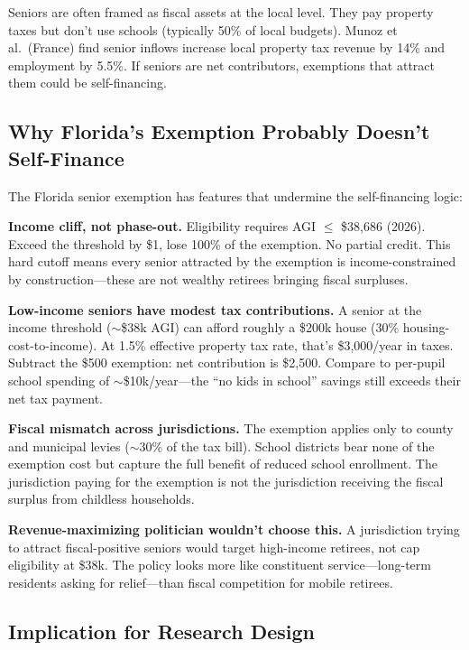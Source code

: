 \documentclass[11pt]{article}
\begin{document}
Seniors are often framed as fiscal assets at the local level. They pay property taxes but don't use schools (typically 50\% of local budgets). Munoz et al.\ (France) find senior inflows increase local property tax revenue by 14\% and employment by 5.5\%. If seniors are net contributors, exemptions that attract them could be self-financing.

\subsection{Why Florida's Exemption Probably Doesn't Self-Finance}

The Florida senior exemption has features that undermine the self-financing logic:

\textbf{Income cliff, not phase-out.} Eligibility requires AGI $\leq$ \$38,686 (2026). Exceed the threshold by \$1, lose 100\% of the exemption. No partial credit. This hard cutoff means every senior attracted by the exemption is income-constrained by construction---these are not wealthy retirees bringing fiscal surpluses.

\textbf{Low-income seniors have modest tax contributions.} A senior at the income threshold ($\sim$\$38k AGI) can afford roughly a \$200k house (30\% housing-cost-to-income). At 1.5\% effective property tax rate, that's \$3,000/year in taxes. Subtract the \$500 exemption: net contribution is \$2,500. Compare to per-pupil school spending of $\sim$\$10k/year---the ``no kids in school'' savings still exceeds their net tax payment.

\textbf{Fiscal mismatch across jurisdictions.} The exemption applies only to county and municipal levies ($\sim$30\% of the tax bill). School districts bear none of the exemption cost but capture the full benefit of reduced school enrollment. The jurisdiction paying for the exemption is not the jurisdiction receiving the fiscal surplus from childless households.

\textbf{Revenue-maximizing politician wouldn't choose this.} A jurisdiction trying to attract fiscal-positive seniors would target high-income retirees, not cap eligibility at \$38k. The policy looks more like constituent service---long-term residents asking for relief---than fiscal competition for mobile retirees.

\subsection{Implication for Research Design}
\end{document}
